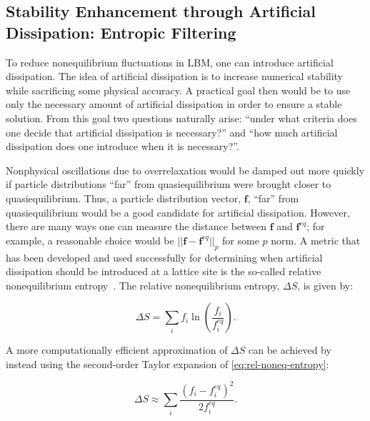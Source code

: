 \subsection{Stability Enhancement through Artificial Dissipation: Entropic Filtering}

To reduce nonequilibrium fluctuations in LBM, one can introduce artificial dissipation.
The idea of artificial dissipation is to increase numerical stability while sacrificing some physical accuracy.
A practical goal then would be to use only the necessary amount of artificial dissipation in order to ensure a stable solution.
From this goal two questions naturally arise: ``under what criteria does one decide that artificial dissipation is necessary?'' and ``how much artificial dissipation does one introduce when it is necessary?''.

Nonphysical oscillations due to overrelaxation would be damped out more quickly if particle distributions ``far'' from quasiequilibrium were brought closer to quasiequilibrium.
Thus, a particle distribution vector, $\mathbf{f}$, ``far'' from quasiequilibrium would be a good candidate for artificial dissipation.
However, there are many ways one can measure the distance between $\mathbf{f}$ and $\mathbf{f}^{eq}$; for example, a reasonable choice would be $||\mathbf{f} - \mathbf{f}^{eq}||_p$ for some $p$ norm.
A metric that has been developed and used successfully for determining when artificial dissipation should be introduced at a lattice site is the so-called relative nonequilibrium entropy~\cite{gorban2014enhancement,brownlee2006stabilization,brownlee2007stability,brownlee2008nonequilibrium,packwood2009entropy}.
The relative nonequilibrium entropy, $\Delta S$, is given by:

\begin{equation} \label{eq:rel-noneq-entropy}
\Delta S = \sum_i f_i \ln\left(\frac{f_i}{f^{eq}_i}\right).
\end{equation}

\noindent A more computationally efficient approximation of $\Delta S$ can be achieved by instead using the second-order Taylor expansion of \eqref{eq:rel-noneq-entropy}:

\begin{equation} \label{eq:quadratic-entropy}
\Delta S \approx \sum_i \frac{(f_i - f^{eq}_i)^2}{2f^{eq}_i}.
\end{equation}

